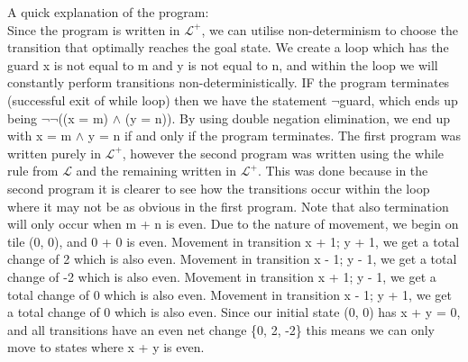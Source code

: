 \documentclass{article}
\begin{document}
\begin{enumerate}[(a)]
    A quick explanation of the program:\\
    Since the program is written in $\mathcal{L}^{+}$, we can utilise non-determinism to choose the transition that optimally reaches the goal state. We create a loop which has the guard x is not equal to m and y is not equal to n, and within the loop we will constantly perform transitions non-deterministically. IF the program terminates (successful exit of while loop) then we have the statement $\neg$guard, which ends up being $\neg\neg$((x = m) $\land$ (y = n)). By using double negation elimination, we end up with x = m $\land$ y = n if and only if the program terminates. The first program was written purely in  $\mathcal{L}^{+}$, however the second program was written using the while rule from  $\mathcal{L}$ and the remaining written in $\mathcal{L}^{+}$. This was done because in the second program it is clearer to see how the transitions occur within the loop where it may not be as obvious in the first program. Note that also termination will only occur when m + n is even. Due to the nature of movement, we begin on tile (0, 0), and 0 + 0 is even. Movement in transition x + 1; y + 1, we get a total change of 2 which is also even. Movement in transition x - 1; y - 1, we get a total change of -2 which is also even. Movement in transition x + 1; y - 1, we get a total change of 0 which is also even. Movement in transition x - 1; y + 1, we get a total change of 0 which is also even. Since our initial state (0, 0) has x + y = 0, and all transitions have an even net change \{0, 2, -2\} this means we can only move to states where x + y is even. 



\end{enumerate}
\end{document}
